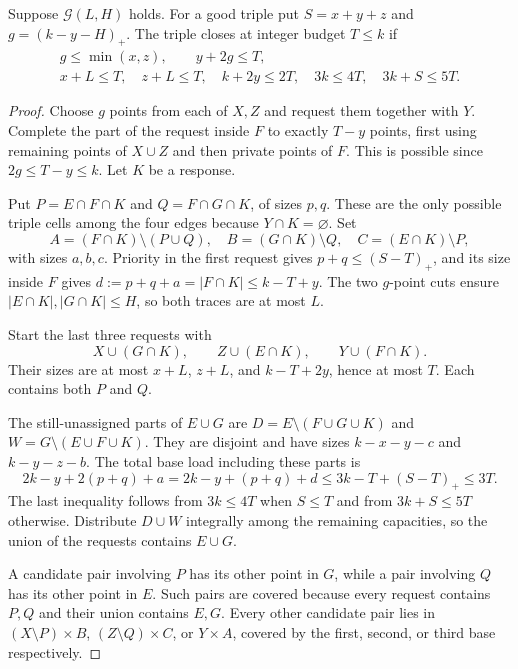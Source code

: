 \begin{lemma}\label{lem:gaptwo}
Suppose $\mathcal G(L,H)$ holds. For a good triple put $S=x+y+z$ and
$g=(k-y-H)_+$. The triple closes at integer budget $T\le k$ if
\begin{gather}
 g\le\min(x,z),\qquad y+2g\le T,\label{eq:g2exact}\\
 x+L\le T,\quad z+L\le T,\quad k+2y\le2T,\quad
 3k\le4T,\quad 3k+S\le5T.\nonumber
\end{gather}
\end{lemma}
\begin{proof}
Choose $g$ points from each of $X,Z$ and request them together with $Y$.
Complete the part of the request inside $F$ to exactly $T-y$ points,
first using remaining points of $X\cup Z$ and then private points of
$F$. This is possible since $2g\le T-y\le k$. Let $K$ be a response.

Put $P=E\cap F\cap K$ and $Q=F\cap G\cap K$, of sizes $p,q$.
These are the only possible triple cells among the four edges because
$Y\cap K=\varnothing$. Set
\[
 A=(F\cap K)\setminus(P\cup Q),\quad
 B=(G\cap K)\setminus Q,\quad C=(E\cap K)\setminus P,
\]
with sizes $a,b,c$. Priority in the first request gives
$p+q\le(S-T)_+$, and its size inside $F$ gives
$d:=p+q+a=|F\cap K|\le k-T+y$.
The two $g$-point cuts ensure $|E\cap K|,|G\cap K|\le H$, so both
traces are at most $L$.

Start the last three requests with
\[
 X\cup(G\cap K),\qquad Z\cup(E\cap K),\qquad Y\cup(F\cap K).
\]
Their sizes are at most $x+L$, $z+L$, and $k-T+2y$, hence at most $T$.
Each contains both $P$ and $Q$.

The still-unassigned parts of $E\cup G$ are
$D=E\setminus(F\cup G\cup K)$ and
$W=G\setminus(E\cup F\cup K)$. They are disjoint and have sizes
$k-x-y-c$ and $k-y-z-b$. The total base load including these parts is
\[
 2k-y+2(p+q)+a=2k-y+(p+q)+d\le3k-T+(S-T)_+\le3T.
\]
The last inequality follows from $3k\le4T$ when $S\le T$ and from
$3k+S\le5T$ otherwise. Distribute $D\cup W$ integrally among the
remaining capacities, so the union of the requests contains $E\cup G$.

A candidate pair involving $P$ has its other point in $G$, while a pair
involving $Q$ has its other point in $E$. Such pairs are covered because
every request contains $P,Q$ and their union contains $E,G$. Every other
candidate pair lies in $(X\setminus P)\times B$,
$(Z\setminus Q)\times C$, or $Y\times A$, covered by the first, second,
or third base respectively.
\end{proof}

